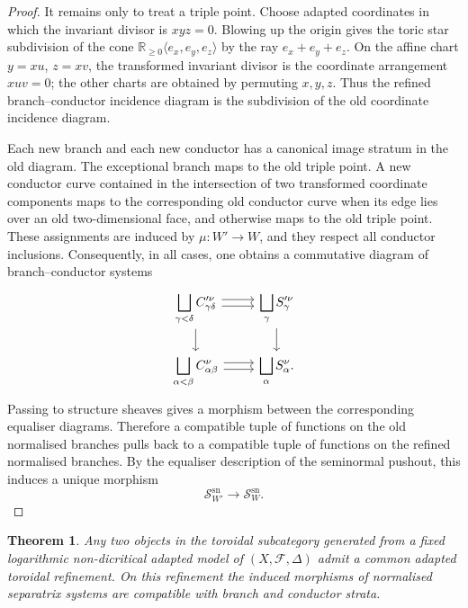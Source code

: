 \documentclass[11pt]{amsart}
\numberwithin{equation}{section}
\theoremstyle{plain}
\newtheorem{Theorem}{Theorem}[section]
\theoremstyle{definition}
\newcommand{\sn}{\mathrm{sn}}
\newcommand{\cF}{\mathcal F}
\begin{document}
\begin{proof}
It remains only to treat a triple point. Choose adapted coordinates in which the invariant divisor is \(xyz=0\). Blowing up the origin gives the toric star subdivision of the cone \(\mathbb R_{\geq 0}\langle e_x,e_y,e_z\rangle\) by the ray \(e_x+e_y+e_z\). On the affine chart \(y=xu\), \(z=xv\), the transformed invariant divisor is the coordinate arrangement \(xuv=0\); the other charts are obtained by permuting \(x,y,z\). Thus the refined branch--conductor incidence diagram is the subdivision of the old coordinate incidence diagram.

Each new branch and each new conductor has a canonical image stratum in the old diagram. The exceptional branch maps to the old triple point. A new conductor curve contained in the intersection of two transformed coordinate components maps to the corresponding old conductor curve when its edge lies over an old two-dimensional face, and otherwise maps to the old triple point. These assignments are induced by \(\mu:W'\to W\), and they respect all conductor inclusions.
Consequently, in all cases, one obtains a commutative diagram of branch--conductor systems
\[
\begin{tikzcd}
\displaystyle\bigsqcup_{\gamma<\delta} C_{\gamma\delta}^{\prime\nu}
\arrow[r,shift left=.6ex] \arrow[r,shift right=.6ex] \arrow[d] &
\displaystyle\bigsqcup_{\gamma} S_\gamma^{\prime\nu}
\arrow[d]\\
\displaystyle\bigsqcup_{\alpha<\beta} C_{\alpha\beta}^{\nu}
\arrow[r,shift left=.6ex] \arrow[r,shift right=.6ex] &
\displaystyle\bigsqcup_{\alpha} S_\alpha^\nu.
\end{tikzcd}
\]
Passing to structure sheaves gives a morphism between the corresponding equaliser diagrams. Therefore a compatible tuple of functions on the old normalised branches pulls back to a compatible tuple of functions on the refined normalised branches. By the equaliser description of the seminormal pushout, this induces a unique morphism
\[
\mathscr S_{W'}^{\sn}\longrightarrow \mathscr S_W^{\sn}.
\]
\end{proof}

\begin{Theorem}
\label{thm:common-refinement}
Any two objects in the toroidal subcategory generated from a fixed logarithmic non-dicritical adapted model of $(X,\cF,\Delta)$ admit a common adapted toroidal refinement.  On this refinement the induced morphisms of normalised separatrix systems are compatible with branch and conductor strata.
\end{Theorem}
\end{document}
